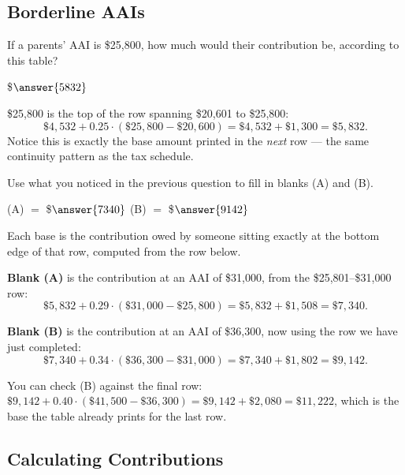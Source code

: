 \documentclass[12pt]{ximera}
\begin{document}
\subsection*{Borderline AAIs}

\begin{problem}
If a parents' AAI is \$25,800, how much would their contribution be, according to this
table?

\$$\answer{5832}$

\begin{solution}
\$25,800 is the top of the row spanning \$20,601 to \$25,800:
\[
\$4{,}532 + 0.25 \cdot (\$25{,}800 - \$20{,}600) = \$4{,}532 + \$1{,}300 = \$5{,}832.
\]
Notice this is exactly the base amount printed in the \emph{next} row --- the same
continuity pattern as the tax schedule.
\end{solution}
\end{problem}

\begin{problem}
Use what you noticed in the previous question to fill in blanks (A) and (B).

(A) $=$ \$$\answer{7340}$ \qquad (B) $=$ \$$\answer{9142}$

\begin{freeResponse}
\end{freeResponse}

\begin{solution}
Each base is the contribution owed by someone sitting exactly at the bottom edge of that
row, computed from the row below.

\textbf{Blank (A)} is the contribution at an AAI of \$31,000, from the \$25,801--\$31,000
row:
\[
\$5{,}832 + 0.29 \cdot (\$31{,}000 - \$25{,}800) = \$5{,}832 + \$1{,}508 = \$7{,}340.
\]

\textbf{Blank (B)} is the contribution at an AAI of \$36,300, now using the row we have
just completed:
\[
\$7{,}340 + 0.34 \cdot (\$36{,}300 - \$31{,}000) = \$7{,}340 + \$1{,}802 = \$9{,}142.
\]

You can check (B) against the final row: $\$9{,}142 + 0.40 \cdot (\$41{,}500 -
\$36{,}300) = \$9{,}142 + \$2{,}080 = \$11{,}222$, which is the base the table already
prints for the last row.
\end{solution}
\end{problem}

\subsection*{Calculating Contributions}
\end{document}
